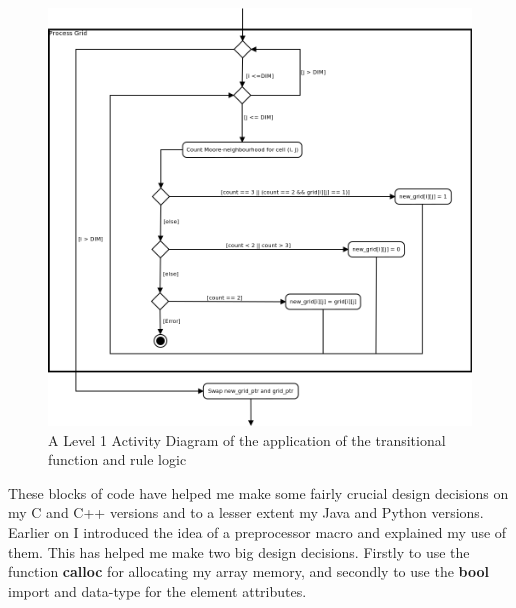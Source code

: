 \documentclass[11pt]{article} %
\begin{document}
\begin{figure}[h]
\centering
\includegraphics[scale=0.4]{sequentialProcessGrid.png}
\caption{A Level 1 Activity Diagram of the application of the transitional function and rule logic}
\label{fig: Algo0}
\end{figure}
These blocks of code have helped me make some fairly crucial design decisions on my C and C++ versions and to a lesser extent my Java and Python versions. Earlier on I introduced the idea of a preprocessor macro and explained my use of them. This has helped me make two big design decisions. Firstly to use the function {\bf calloc} for allocating my array memory, and secondly to use the {\bf bool} import and data-type for the element attributes.
\end{document}
